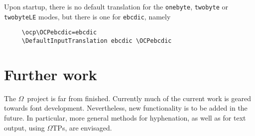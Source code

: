 \documentclass[fleqn]{article}
\newcommand{\OMEGA}{$\Omega$}
\newcommand{\OTP}{\OMEGA TP}
\begin{document}
Upon startup, there is no default translation for the
\texttt{onebyte}, \texttt{twobyte} or \texttt{twobyteLE} modes,
but there is one for \texttt{ebcdic}, namely 
\begin{verbatim}
     \ocp\OCPebcdic=ebcdic
     \DefaultInputTranslation ebcdic \OCPebcdic
\end{verbatim}

\section{Further work}

The \OMEGA\ project is far from finished.  Currently much of the current
work is geared towards font development.  Nevertheless, new
functionality is to be added in the future.  In particular, more
general methods for hyphenation, as well as for text output, using
\OTP s, are envisaged.
\end{document}
